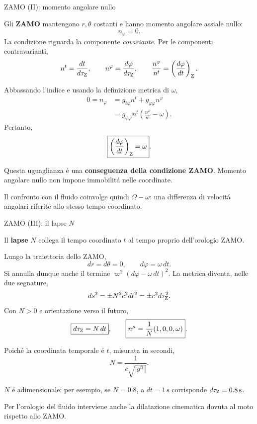 \begin{frame}[t]{ZAMO (II): momento angolare nullo}
\small\raggedright

Gli \textbf{ZAMO} mantengono $r,\theta$ costanti
e hanno momento angolare assiale nullo:
\[
\boxed{n_\varphi=0}.
\]
La condizione riguarda la componente \emph{covariante}.
Per le componenti contravarianti,
\[
n^t=\frac{dt}{d\tau_{\rm Z}},\qquad
n^\varphi=\frac{d\varphi}{d\tau_{\rm Z}},
\qquad
\frac{n^\varphi}{n^t}
=\left(\frac{d\varphi}{dt}\right)_{\rm Z}.
\]

Abbassando l'indice e usando la definizione metrica di $\omega$,
\[
\begin{aligned}
0=n_\varphi
&=g_{t\varphi}n^t+g_{\varphi\varphi}n^\varphi\\
&=g_{\varphi\varphi}n^t
\left(\frac{n^\varphi}{n^t}-\omega\right).
\end{aligned}
\]
Pertanto,
\[
\boxed{\left(\frac{d\varphi}{dt}\right)_{\rm Z}=\omega}.
\]

Questa uguaglianza \'e una \textbf{conseguenza della condizione ZAMO}.
Momento angolare nullo non impone immobilit\'a nelle coordinate.

\medskip
Il confronto con il fluido coinvolge quindi
$\Omega-\omega$: una differenza di velocit\'a angolari
riferite allo stesso tempo coordinato.

\end{frame}


\begin{frame}[t]{ZAMO (III): il lapse $N$}
\small\raggedright

Il \textbf{lapse} $N$ collega il tempo coordinato $t$
al tempo proprio dell'orologio ZAMO.

Lungo la traiettoria dello ZAMO,
\[
dr=d\theta=0,\qquad d\varphi=\omega\,dt.
\]
Si annulla dunque anche il termine
$\varpi^2(d\varphi-\omega\,dt)^2$.
La metrica diventa, nelle due segnature,
\[
ds^2=\pm N^2c^2dt^2
=\pm c^2d\tau_{\rm Z}^2.
\]
Con $N>0$ e orientazione verso il futuro,
\[
\boxed{d\tau_{\rm Z}=N\,dt},
\qquad
\boxed{n^\mu=\frac1N(1,0,0,\omega)}.
\]

Poich\'e la coordinata temporale \'e $t$, misurata in secondi,
\[
\boxed{N=\frac1{c\sqrt{|g^{tt}|}}}.
\]

$N$ \'e adimensionale: per esempio, se $N=0.8$,
a $dt=1\,\mathrm{s}$ corrisponde
$d\tau_{\rm Z}=0.8\,\mathrm{s}$.

\medskip
Per l'orologio del fluido interviene anche la dilatazione
cinematica dovuta al moto rispetto allo ZAMO.

\end{frame}


